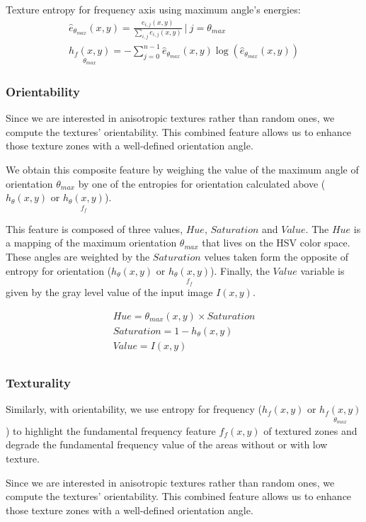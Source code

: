 Texture entropy for frequency axis using maximum angle's energies:
\begin{gather}
    \hat{e}_{\theta _{max}}(x,y) = \frac{e_{i,j}(x,y)}{ \sum_{i,j} e_{i,j}(x,y)} ~|~ j = \theta _{max}\\	
    \underset{\theta_{max}}{h_{f}(x,y)} = -\sum_{j=0}^{n-1} \hat{e}_{\theta _{max}}(x,y)  \log (\hat{e}_{\theta _{max}}(x,y))  \label{eq:entropy_ang_max}
\end{gather}

\subsubsection{Orientability}
Since we are interested in anisotropic textures rather than random ones, we compute the textures' orientability. This combined feature allows us to enhance those texture zones with a well-defined orientation angle. 

We obtain this composite feature by weighing the value of the maximum angle of orientation $\theta_{max}$ by one of the entropies for orientation calculated above ($h_{\theta}(x,y)$ or $\underset{f_{f}}{h_{\theta}(x,y)}$).

This feature is composed of three values, $Hue$, $Saturation$ and $Value$. The $Hue$ is a mapping of the maximum orientation $\theta_{max}$ that lives on the HSV color space. These angles are weighted by the $Saturation$ velues taken form the opposite of entropy for orientation ($h_{\theta}(x,y)$ or $\underset{f_{f}}{h_{\theta}(x,y)}$). Finally, the $Value$ variable is given by the gray level value of the input image $I(x,y)$.

\begin{gather}
    Hue = \theta_{max}(x,y) \times Saturation \\
    Saturation = 1 - h_{\theta} (x,y) \\
    Value = I(x,y) \\
\end{gather}

\subsubsection{Texturality}
Similarly, with orientability, we use entropy for frequency ($h_{f}(x,y)$ or $\underset{\theta_{max}}{h_{f}(x,y)}$) to highlight the fundamental frequency feature $f_f(x,y)$ of textured zones and degrade the fundamental frequency value of the areas without or with low texture.

Since we are interested in anisotropic textures rather than random ones, we compute the textures' orientability. This combined feature allows us to enhance those texture zones with a well-defined orientation angle.

